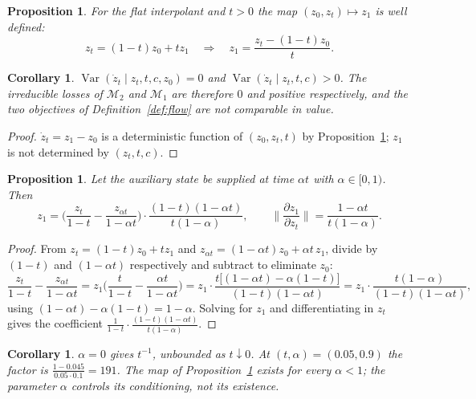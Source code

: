 \documentclass[11pt]{article}
\newtheorem{proposition}[lemma]{Proposition}
\newtheorem{corollary}[lemma]{Corollary}
\theoremstyle{definition}
\theoremstyle{remark}
\DeclareMathOperator{\Var}{Var}
\begin{document}
\begin{proposition}\label{prop:det}
For the flat interpolant and $t>0$ the map $(z_0,z_t)\mapsto z_1$ is well defined:
\[
z_t=(1-t)z_0+tz_1\quad\Longrightarrow\quad z_1=\frac{z_t-(1-t)z_0}{t}.
\]
\end{proposition}

\begin{corollary}\label{cor:loss}
$\Var(\dot z_t\mid z_t,t,c,z_0)=0$ and $\Var(\dot z_t\mid z_t,t,c)>0$. The irreducible losses of
$\mathcal M_2$ and $\mathcal M_1$ are therefore $0$ and positive respectively, and the two
objectives of Definition~\ref{def:flow} are not comparable in value.
\end{corollary}

\begin{proof}
$\dot z_t=z_1-z_0$ is a deterministic function of $(z_0,z_t,t)$ by Proposition~\ref{prop:det};
$z_1$ is not determined by $(z_t,t,c)$.
\end{proof}

\begin{proposition}\label{prop:amp}
Let the auxiliary state be supplied at time $\alpha t$ with $\alpha\in[0,1)$. Then
\[
z_1=\Big(\frac{z_t}{1-t}-\frac{z_{\alpha t}}{1-\alpha t}\Big)\cdot\frac{(1-t)(1-\alpha t)}{t(1-\alpha)},
\qquad
\Big\|\frac{\partial z_1}{\partial z_t}\Big\|=\frac{1-\alpha t}{t(1-\alpha)}.
\]
\end{proposition}

\begin{proof}
From $z_t=(1-t)z_0+tz_1$ and $z_{\alpha t}=(1-\alpha t)z_0+\alpha t\,z_1$, divide by $(1-t)$ and
$(1-\alpha t)$ respectively and subtract to eliminate $z_0$:
\[
\frac{z_t}{1-t}-\frac{z_{\alpha t}}{1-\alpha t}
=z_1\Big(\frac{t}{1-t}-\frac{\alpha t}{1-\alpha t}\Big)
=z_1\cdot\frac{t\big[(1-\alpha t)-\alpha(1-t)\big]}{(1-t)(1-\alpha t)}
=z_1\cdot\frac{t(1-\alpha)}{(1-t)(1-\alpha t)},
\]
using $(1-\alpha t)-\alpha(1-t)=1-\alpha$. Solving for $z_1$ and differentiating in $z_t$ gives the
coefficient $\tfrac{1}{1-t}\cdot\tfrac{(1-t)(1-\alpha t)}{t(1-\alpha)}$.
\end{proof}

\begin{corollary}\label{cor:amp}
$\alpha=0$ gives $t^{-1}$, unbounded as $t\downarrow0$. At $(t,\alpha)=(0.05,0.9)$ the factor is
$\tfrac{1-0.045}{0.05\cdot0.1}=191$. The map of Proposition~\ref{prop:amp} exists for every
$\alpha<1$; the parameter $\alpha$ controls its conditioning, not its existence.
\end{corollary}
\end{document}
